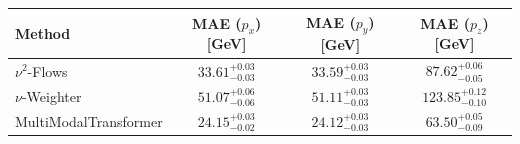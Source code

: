     \begin{tabular}{lccc}
        \toprule
        Method & MAE ($p_x$) [GeV] & MAE ($p_y$) [GeV] & MAE ($p_z$) [GeV] \\
        \midrule
        $\nu^2$-Flows & $33.61^{+0.03}_{-0.03}$ & $33.59^{+0.03}_{-0.03}$ & $87.62^{+0.06}_{-0.05}$ \\
        $\nu$-Weighter & $51.07^{+0.06}_{-0.06}$ & $51.11^{+0.03}_{-0.03}$ & $123.85^{+0.12}_{-0.10}$ \\
        MultiModalTransformer & $24.15^{+0.03}_{-0.02}$ & $24.12^{+0.03}_{-0.03}$ & $63.50^{+0.05}_{-0.09}$ \\
        \bottomrule
    \end{tabular}